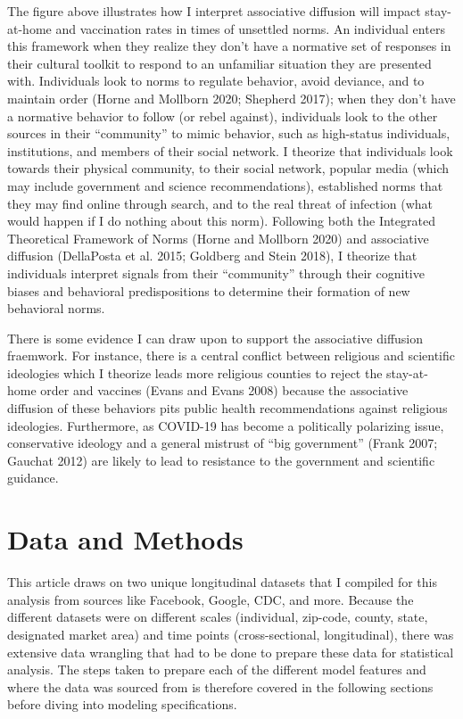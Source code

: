 The figure above illustrates how I interpret associative diffusion will impact
stay-at-home and vaccination rates in times of unsettled norms. An
individual enters this framework when they realize they don't have a normative
set of responses in their cultural toolkit to respond to an unfamiliar situation
they are presented with. Individuals look to norms to regulate behavior, avoid
deviance, and to maintain order (Horne and Mollborn 2020; Shepherd 2017); when they don't have a normative behavior
to follow (or rebel against), individuals look to the other sources in their
``community'' to mimic behavior, such as high-status individuals, institutions,
and members of their social network. I theorize that individuals look towards
their physical community, to their social network, popular media (which may
include government and science recommendations), established norms that they may
find online through search, and to the real threat of infection (what would
happen if I do nothing about this norm). Following both the Integrated
Theoretical Framework of Norms (Horne and Mollborn 2020) and
associative diffusion (DellaPosta et al. 2015; Goldberg and Stein 2018), I theorize that individuals interpret
signals from their ``community'' through their cognitive biases and behavioral
predispositions to determine their formation of new behavioral norms.

There is some evidence I can draw upon to support the associative diffusion
fraemwork. For instance, there is a central conflict between religious and
scientific ideologies which I theorize leads more religious counties to reject
the stay-at-home order and vaccines (Evans and Evans 2008)
because the associative diffusion of these behaviors pits public health
recommendations against religious ideologies.
Furthermore, as COVID-19 has become a politically polarizing issue, conservative
ideology and a general mistrust of ``big government'' (Frank 2007; Gauchat 2012) are likely to lead to resistance to the
government and scientific guidance.

\hypertarget{data-and-methods}{%
\section{Data and Methods}\label{data-and-methods}}

This article draws on two unique longitudinal datasets that I compiled for this
analysis from sources like Facebook, Google, CDC, and more. Because the
different datasets were on different scales (individual, zip-code, county,
state, designated market area) and time points (cross-sectional, longitudinal),
there was extensive data wrangling that had to be done to prepare these data for
statistical analysis. The steps taken to prepare each of the different model
features and where the data was sourced from is therefore covered in the
following sections before diving into modeling specifications.

